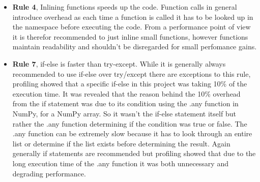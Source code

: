 \documentclass[12pt, a4paper]{article}
\begin{document}
\begin{itemize}

    \item \textbf{Rule 4}, Inlining functions speeds up the code.
    Function calls in general introduce overhead as each time a function is called it has to be looked up in the namespace before executing the code.
    From a performance point of view it is therefor recommended to just inline small functions, however functions maintain readability and shouldn't be disregarded for small perfomance gains. 



    \item \textbf{Rule 7}, if-else is faster than try-except.
    While it is generally always recommended to use if-else over try/except there are exceptions to this rule, profiling showed that a specific if-else in this project was taking 10\% of the execution time.
    It was revealed that the reason behind the 10\% overhead from the if statement was due to its condition using the .any function in NumPy, for a NumPy array.
    So it wasn't the if-else statement itself but rather the .any function determining if the condition was true or false.
    The .any function can be extremely slow because it has to look through an entire list or determine if the list exists before determining the result.
    Again generally if statements are recommended but profiling showed that due to the long execution time of the .any function it was both unnecessary and degrading performance.


\end{itemize}
\end{document}
